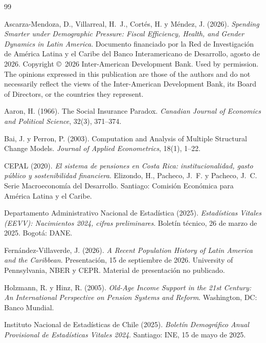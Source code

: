 \documentclass[12pt, letterpaper]{article}
\begin{document}
\begin{thebibliography}{99}

 Ascarza-Mendoza, D., Villarreal,
H.~J., Cortés, H. y Méndez, J. (2026). \textit{Spending Smarter under Demographic
Pressure: Fiscal Efficiency, Health, and Gender Dynamics in Latin America}.
Documento financiado por la Red de Investigación de América Latina y el Caribe del
Banco Interamericano de Desarrollo, agosto de 2026. Copyright \copyright~2026
Inter-American Development Bank. Used by permission. The opinions expressed in this
publication are those of the authors and do not necessarily reflect the views of
the Inter-American Development Bank, its Board of Directors, or the countries they
represent.

 Aaron, H. (1966). The Social Insurance Paradox.
\textit{Canadian Journal of Economics and Political Science}, 32(3), 371--374.

 Bai, J. y Perron, P. (2003).
Computation and Analysis of Multiple Structural Change Models.
\textit{Journal of Applied Econometrics}, 18(1), 1--22.

 CEPAL (2020). \textit{El sistema de pensiones en
Costa Rica: institucionalidad, gasto público y sostenibilidad financiera}.
Elizondo, H., Pacheco, J.~F. y Pacheco, J.~C. Serie Macroeconomía del Desarrollo.
Santiago: Comisión Económica para América Latina y el Caribe.

 Departamento Administrativo Nacional de Estadística
(2025). \textit{Estadísticas Vitales (EEVV): Nacimientos 2024, cifras preliminares}.
Boletín técnico, 26 de marzo de 2025. Bogotá: DANE.

 Fernández-Villaverde, J. (2026).
\textit{A Recent Population History of Latin America and the Caribbean}.
Presentación, 15 de septiembre de 2026. University of Pennsylvania, NBER y CEPR.
Material de presentación no publicado.

 Holzmann, R. y Hinz, R. (2005).
\textit{Old-Age Income Support in the 21st Century: An International Perspective
on Pension Systems and Reform}. Washington, DC: Banco Mundial.

 Instituto Nacional de Estadísticas de Chile (2025).
\textit{Boletín Demográfico Anual Provisional de Estadísticas Vitales 2024}.
Santiago: INE, 15 de mayo de 2025.


\end{thebibliography}
\end{document}
